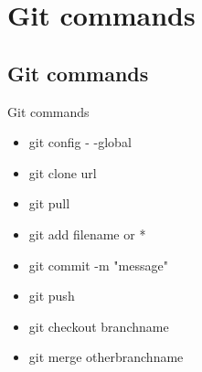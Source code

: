 \section{Git commands}
\subsection{Git commands}
\begin{frame}{Git commands}
    \begin{itemize}
        \item git config - -global
        \item git clone url
        \item git pull
        \item git add filename or *
        \item git commit -m "message"
        \item git push
        \item git checkout branchname
        \item git merge otherbranchname
    \end{itemize}
\end{frame}

